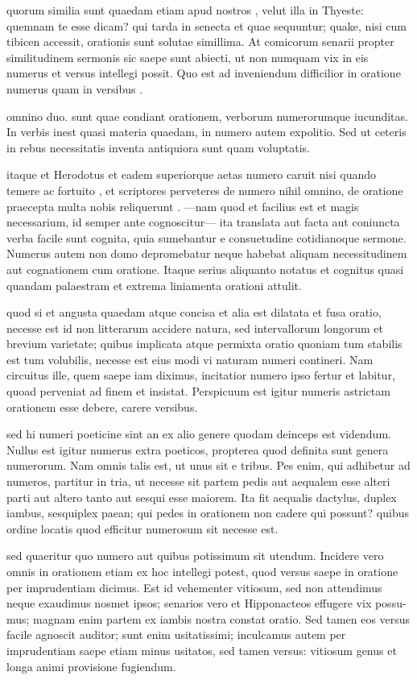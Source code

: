  quorum similia sunt quaedam etiam apud nostros , velut illa in Thyeste: quemnam te esse dicam? qui tarda in senecta et quae sequuntur; quake, nisi cum tibicen accessit, orationis sunt solutae simillima. At comicorum senarii propter similitudinem sermonis sic saepe sunt abiecti, ut non numquam vix in eis numerus et versus intellegi possit. Quo est ad inveniendum difficilior in oratione numerus quam in versibus .

 omnino duo. sunt quae condiant orationem, verborum numerorumque iucunditas. In verbis inest quasi materia quaedam, in numero autem expolitio. Sed ut ceteris in rebus necessitatis inventa antiquiora sunt quam voluptatis.

 itaque et Herodotus et eadem superiorque aetas numero caruit nisi quando temere ac fortuito , et scriptores perveteres de numero nihil omnino, de oratione praecepta multa nobis reliquerunt . —nam quod et facilius est et magis necessarium, id semper ante cognoscitur— ita translata aut facta aut coniuncta verba facile sunt cognita, quia sumebantur e consuetudine cotidianoque sermone. Numerus autem non domo depromebatur neque habebat aliquam necessitudinem aut cognationem cum oratione. Itaque serius aliquanto notatus et cognitus quasi quandam palaestram et extrema liniamenta orationi attulit.

 quod si et angusta quaedam atque concisa et alia est dilatata et fusa oratio, necesse est id non litterarum accidere natura, sed intervallorum longorum et brevium varietate; quibus implicata atque permixta oratio quoniam tum stabilis est tum volubilis, necesse est eius modi vi naturam numeri contineri. Nam circuitus ille, quem saepe iam diximus, incitatior numero ipso fertur et labitur, quoad perveniat ad finem et insistat. Perspicuum est igitur numeris astrictam orationem esse debere, carere versibus.

 sed hi numeri poeticine sint an ex alio genere quodam deinceps est videndum. Nullus est igitur numerus extra poeticos, propterea quod definita sunt genera numerorum. Nam omnis talis est, ut unus sit e tribus. Pes enim, qui adhibetur ad numeros, partitur in tria, ut necesse sit partem pedis aut aequalem esse alteri parti aut altero tanto aut sesqui esse maiorem. Ita fit aequalis dactylus, duplex iambus, sesquiplex paean; qui pedes in orationem non cadere qui possunt? quibus ordine locatis quod efficitur numerosum sit necesse est.

 sed quaeritur quo numero aut quibus potissimum sit utendum. Incidere vero omnis in orationem etiam ex hoc intellegi potest, quod versus saepe in oratione per imprudentiam dicimus. Est id vehementer vitiosum, sed non attendimus neque exaudimus nosmet ipsos; senarios vero et Hipponacteos effugere vix possu- mus; magnam enim partem ex iambis nostra constat oratio. Sed tamen eos versus facile agnoscit auditor; sunt enim usitatissimi; inculcamus autem per imprudentiam saepe etiam minus usitatos, sed tamen versus: vitiosum genus et longa animi provisione fugiendum.

